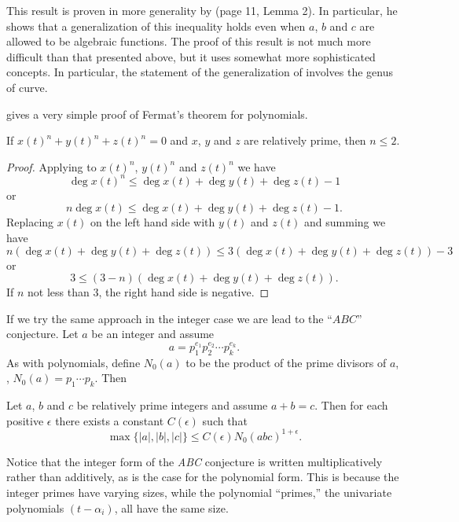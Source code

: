 This result is proven in more generality by {\Mason}
\cite{Mason1984-mb} (page 11, Lemma 2).  In particular, he shows that a
generalization of this inequality holds even when $a$, $b$ and $c$ are
allowed to be algebraic functions.  The proof of this result is not
much more difficult than that presented above, but it uses somewhat
more sophisticated concepts. In particular, the statement of the
generalization of  involves the genus of
curve.

 gives a very simple proof of Fermat's theorem for
polynomials.

\begin{proposition}\label{Poly:FLT:Prop}
If $x(t)^n + y(t)^n + z(t)^n = 0$ and $x$, $y$ and $z$ are relatively
prime, then $n \le 2$.
\end{proposition}

\begin{proof}
Applying  to $x(t)^n$, $y(t)^n$ and $z(t)^n$
we have
\[
\deg x(t)^n \le \deg x(t) + \deg y(t) + \deg z(t) - 1
\]
or
\[
n \deg x(t) \le \deg x(t) + \deg y(t) + \deg z(t) - 1.
\]
Replacing $x(t)$ on the left hand side with $y(t)$ and $z(t)$ and
summing we have
\[
n (\deg x(t) + \deg y(t) + \deg z(t)) 
   \le 3 (\deg x(t) + \deg y(t) + \deg z(t)) - 3
\]
or
\[
3 \le (3 - n) (\deg x(t) + \deg y(t) + \deg z(t)).
\]
If $n$ not less than $3$, the right hand side is negative.
\end{proof}

\medskip
If we try the same approach in the integer case we are lead to the
``$ABC$'' conjecture.  Let $a$ be an integer and assume
\[
a = p_1^{e_1} p_2^{e_2} \cdots p_k^{e_k}.
\]
As with polynomials, define $N_0(a)$ to be the product of the prime
divisors of $a$, \ie, $N_0(a) = p_1 \cdots p_k$.  Then

\def\ABCconj{{\em ABC} conjecture\index{ABC conjecture@{\em ABC} conjecture}}
\begin{conjecture}[ABC] \label{ABC:Conj}
Let $a$, $b$ and $c$ be relatively prime integers and assume $a+b =
c$.  Then for each positive $\epsilon$ there exists a constant
$C(\epsilon)$ such that
\[
\max\{|a|, |b|, |c| \} \le C(\epsilon) N_0(abc)^{1+\epsilon}.
\]
\end{conjecture}

Notice that the integer form of the {\ABCconj} is written
multiplicatively rather than additively, as is the case for the
polynomial form.  This is because the integer primes have varying
sizes, while the polynomial ``primes,'' the univariate polynomials $(t
- \alpha_i)$, all have the same size.

